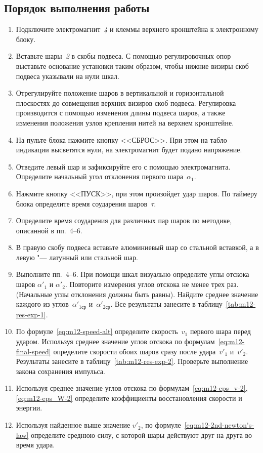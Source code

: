 \documentclass[a4paper, 12pt]{extarticle}
\begin{document}
\subsection{Порядок выполнения работы}
\begin{enumerate}
\item Подключите электромагнит~\emph{4} и клеммы верхнего кронштейна к электронному блоку.
\item Вставьте шары~\emph{2} в скобы подвеса. С помощью регулировочных опор выставьте основание установки таким образом, чтобы нижние визиры скоб подвеса указывали на нули шкал.
\item Отрегулируйте положение шаров в вертикальной и горизонтальной плоскостях до совмещения верхних визиров скоб подвеса. Регулировка производится с помощью изменения длины подвеса шаров, а также изменения положения узлов крепления нитей на верхнем кронштейне.
\item На пульте блока нажмите кнопку <<СБРОС>>. При этом на табло индикации высветятся нули, на электромагнит будет подано напряжение.
\item Отведите левый шар и зафиксируйте его с помощью электромагнита. Определите начальный угол отклонения первого шара~$\alpha_1$.
\item Нажмите кнопку <<ПУСК>>, при этом произойдет удар шаров. По таймеру блока определите время соударения шаров~$\tau$.
\item Определите время соударения для различных пар шаров по методике, описанной в пп.~4--6.
\item В правую скобу подвеса вставьте алюминиевый шар со стальной вставкой, а в левую "--- латунный или стальной шар.
\item Выполните пп.~4--6. При помощи шкал визуально определите углы отскока шаров $\alpha'_1$  и $\alpha'_2$. Повторите измерения углов отскока не менее  трех раз. (Начальные углы отклонения должны быть равны). Найдите среднее значение каждого из углов~$\alpha'_{1\text{ср}}$ и~$\alpha'_{2\text{ср}}$. Все результаты занесите в таблицу~\ref{tab:m12-res-exp-1}.
\item По формуле~\eqref{eq:m12-speed-alt} определите скорость~$v_1$ первого шара перед ударом. Используя среднее значение углов отскока по формулам~\eqref{eq:m12-final-speed} определите скорости обоих шаров сразу после удара~$v'_1$  и~$v'_2$. Результаты занесите в таблицу~\ref{tab:m12-res-exp-2}. Проверьте выполнение закона сохранения импульса.
\item Используя среднее значение углов отскока по формулам~\eqref{eq:m12-eps_v-2}, \eqref{eq:m12-eps_W-2} определите коэффициенты восстановления скорости и энергии.
\item Используя найденное выше значение $v'_2$, по формуле~\eqref{eq:m12-2nd-newton's-law} определите среднюю силу, с которой шары действуют друг на друга во время удара.


\end{enumerate}
\end{document}
